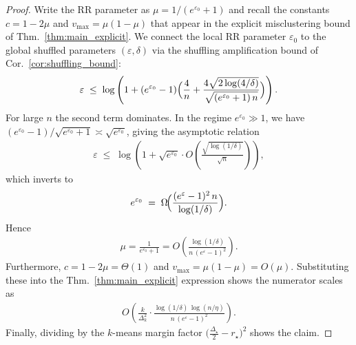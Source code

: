 \documentclass[11pt]{article}
\theoremstyle{plain}
\theoremstyle{definition}
\theoremstyle{remark}
\begin{document}
\begin{proof}
Write the RR parameter as $\mu=1/(e^{\varepsilon_0}+1)$ and recall the constants 
$c=1-2\mu$ and $v_{\max}=\mu(1-\mu)$ that appear in the explicit misclustering bound of Thm.~\ref{thm:main_explicit}. 
We connect the local RR parameter $\varepsilon_0$ to the global shuffled parameters $(\varepsilon,\delta)$ via the shuffling amplification bound of Cor.~\ref{cor:shuffling_bound}:
\begin{equation*}
\begin{aligned}
\varepsilon \;\le\; 
\log \left(1 + (e^{\varepsilon_0}-1)\Bigl(\frac{4}{n} + \frac{4\sqrt{2\log(4/\delta)}}{\sqrt{(e^{\varepsilon_0}+1)\,n}}\Bigr)\right).
\end{aligned}
\end{equation*}
For large $n$ the second term dominates. In the regime $e^{\varepsilon_0}\gg 1$, we have $(e^{\varepsilon_0}-1)/\sqrt{e^{\varepsilon_0}+1}\asymp\sqrt{e^{\varepsilon_0}}$, giving the asymptotic relation
\begin{equation*}
\begin{aligned}
\varepsilon \;\le\; \log\left(1 + \sqrt{e^{\varepsilon_0}}\cdot O\!\left(\frac{\sqrt{\log(1/\delta)}}{\sqrt{n}}\right)\right),
\end{aligned}
\end{equation*}
which inverts to
\begin{equation*}
\begin{aligned}
e^{\varepsilon_0} \;=\; \Omega\!\Bigl(\frac{(e^{\varepsilon}-1)^2\,n}{\log(1/\delta)}\Bigr).
\end{aligned}
\end{equation*}
Hence
\begin{equation*}
\begin{aligned}
\mu=\frac{1}{e^{\varepsilon_0}+1}
= O\!\left(\frac{\log(1/\delta)}{n\,(e^{\varepsilon}-1)^2}\right).
\end{aligned}
\end{equation*}
Furthermore, $c=1-2\mu=\Theta(1)$ and $v_{\max}=\mu(1-\mu)=O(\mu)$.
Substituting these into the Thm.~\ref{thm:main_explicit} expression shows the numerator scales as
\begin{equation*}
\begin{aligned}
O\!\left(\frac{k}{\Delta_k^2}\cdot
\frac{\log(1/\delta)\,\log(n/\eta)}{n\,(e^{\varepsilon}-1)^2}\right).
\end{aligned}
\end{equation*}
Finally, dividing by the $k$-means margin factor $\bigl(\tfrac{\Delta_\star}{2}-r_\star\bigr)^2$ shows the claim.
\end{proof}
\end{document}
